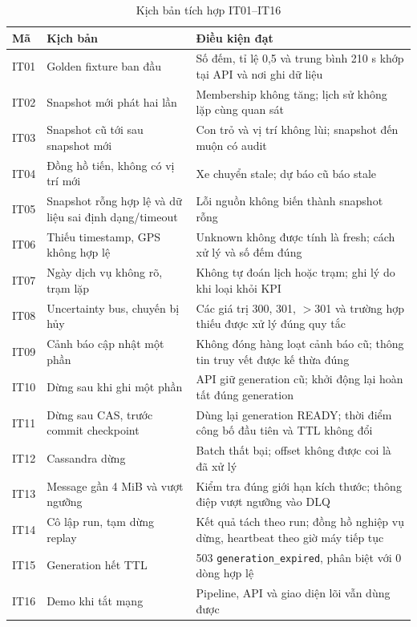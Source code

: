 \begin{table}[H]
\centering
\tablefont
\caption{Kịch bản tích hợp IT01--IT16}
\label{tab:it}
\begin{tabular}{p{1.07cm}p{5.27cm}p{8.79cm}}
\toprule
\textbf{Mã} & \textbf{Kịch bản} & \textbf{Điều kiện đạt} \\
\midrule
IT01 & Golden fixture ban đầu & Số đếm, tỉ lệ 0,5 và trung bình 210 s khớp tại API và nơi ghi dữ liệu \\
IT02 & Snapshot mới phát hai lần & Membership không tăng; lịch sử không lặp cùng quan sát \\
IT03 & Snapshot cũ tới sau snapshot mới & Con trỏ và vị trí không lùi; snapshot đến muộn có audit \\
IT04 & Đồng hồ tiến, không có vị trí mới & Xe chuyển stale; dự báo cũ báo stale \\
IT05 & Snapshot rỗng hợp lệ và dữ liệu sai định dạng/timeout & Lỗi nguồn không biến thành snapshot rỗng \\
IT06 & Thiếu timestamp, GPS không hợp lệ & Unknown không được tính là fresh; cách xử lý và số đếm đúng \\
IT07 & Ngày dịch vụ không rõ, trạm lặp & Không tự đoán lịch hoặc trạm; ghi lý do khi loại khỏi KPI \\
IT08 & Uncertainty bus, chuyến bị hủy & Các giá trị 300, 301, $>$301 và trường hợp thiếu được xử lý đúng quy tắc \\
IT09 & Cảnh báo cập nhật một phần & Không đóng hàng loạt cảnh báo cũ; thông tin truy vết được kế thừa đúng \\
IT10 & Dừng sau khi ghi một phần & API giữ generation cũ; khởi động lại hoàn tất đúng generation \\
IT11 & Dừng sau CAS, trước commit checkpoint & Dùng lại generation READY; thời điểm công bố đầu tiên và TTL không đổi \\
IT12 & Cassandra dừng & Batch thất bại; offset không được coi là đã xử lý \\
IT13 & Message gần 4 MiB và vượt ngưỡng & Kiểm tra đúng giới hạn kích thước; thông điệp vượt ngưỡng vào DLQ \\
IT14 & Cô lập run, tạm dừng replay & Kết quả tách theo run; đồng hồ nghiệp vụ dừng, heartbeat theo giờ máy tiếp tục \\
IT15 & Generation hết TTL & 503 \texttt{generation\_expired}, phân biệt với 0 dòng hợp lệ \\
IT16 & Demo khi tắt mạng & Pipeline, API và giao diện lõi vẫn dùng được \\
\bottomrule
\end{tabular}
\end{table}

